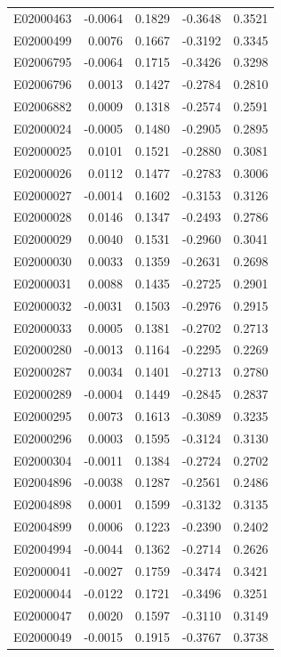 \documentclass[11pt, a4paper]{article}
\begin{document}
\begin{longtable}{lrrrr}
E02000463 & -0.0064 & 0.1829 & -0.3648 & 0.3521 \\
E02000499 & 0.0076 & 0.1667 & -0.3192 & 0.3345 \\
E02006795 & -0.0064 & 0.1715 & -0.3426 & 0.3298 \\
E02006796 & 0.0013 & 0.1427 & -0.2784 & 0.2810 \\
E02006882 & 0.0009 & 0.1318 & -0.2574 & 0.2591 \\
E02000024 & -0.0005 & 0.1480 & -0.2905 & 0.2895 \\
E02000025 & 0.0101 & 0.1521 & -0.2880 & 0.3081 \\
E02000026 & 0.0112 & 0.1477 & -0.2783 & 0.3006 \\
E02000027 & -0.0014 & 0.1602 & -0.3153 & 0.3126 \\
E02000028 & 0.0146 & 0.1347 & -0.2493 & 0.2786 \\
E02000029 & 0.0040 & 0.1531 & -0.2960 & 0.3041 \\
E02000030 & 0.0033 & 0.1359 & -0.2631 & 0.2698 \\
E02000031 & 0.0088 & 0.1435 & -0.2725 & 0.2901 \\
E02000032 & -0.0031 & 0.1503 & -0.2976 & 0.2915 \\
E02000033 & 0.0005 & 0.1381 & -0.2702 & 0.2713 \\
E02000280 & -0.0013 & 0.1164 & -0.2295 & 0.2269 \\
E02000287 & 0.0034 & 0.1401 & -0.2713 & 0.2780 \\
E02000289 & -0.0004 & 0.1449 & -0.2845 & 0.2837 \\
E02000295 & 0.0073 & 0.1613 & -0.3089 & 0.3235 \\
E02000296 & 0.0003 & 0.1595 & -0.3124 & 0.3130 \\
E02000304 & -0.0011 & 0.1384 & -0.2724 & 0.2702 \\
E02004896 & -0.0038 & 0.1287 & -0.2561 & 0.2486 \\
E02004898 & 0.0001 & 0.1599 & -0.3132 & 0.3135 \\
E02004899 & 0.0006 & 0.1223 & -0.2390 & 0.2402 \\
E02004994 & -0.0044 & 0.1362 & -0.2714 & 0.2626 \\
E02000041 & -0.0027 & 0.1759 & -0.3474 & 0.3421 \\
E02000044 & -0.0122 & 0.1721 & -0.3496 & 0.3251 \\
E02000047 & 0.0020 & 0.1597 & -0.3110 & 0.3149 \\
E02000049 & -0.0015 & 0.1915 & -0.3767 & 0.3738 \\

\end{longtable}
\end{document}
